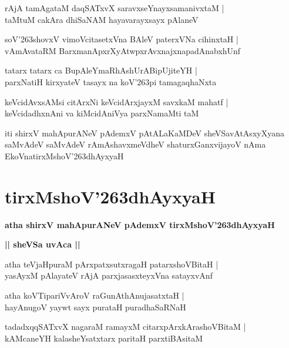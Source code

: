 \documentclass[twoside,12pt,openright]{book}
\def\S{\char'263}
\newcounter{shloka}[chapter]
\def\uvaca#1{\centerline{{\large\textbf{#1}}}}
\begin{document}
\begin{shloka}%
rAjA tamAgataM daqSATxvX saravxseYnayxsamanivxtaM |\\
taMtuM cakAra dhiSaNAM hayavarayxsayx pAlaneV 
\end{shloka}

\begin{shloka}%
soV\S shovxV vimoVcitasetxVna BAleV paterxVNa cihinxtaH |\\
vAmAvataRM BarxmanApxrXyAtwpxrAvxnajxnapadAnabxhUnf 
\end{shloka}

\begin{shloka}%
tatarx tatarx ca BupAleYmaRhAshUrABipUjiteYH |\\
parxNatiH kirxyateV tasayx na koV\S pi tamagaqhaNxta
\end{shloka}

\begin{shloka}%
keVcidAvxsAMsi citArxNi keVcidArxjayxM savxkaM mahatf |\\
keVcidadhxnAni va kiMcidAniVya parxNamaMti taM 
\end{shloka}

\begin{center}
iti shirxV mahApurANeV pAdemxV pAtALaKaMDeV sheVSavAtAsxyXyana saMvAdeV 
saMvAdeV rAmAshavxmeVdheV shaturxGanxvijayoV nAma EkoVnatirxMshoV\S dhAyxyaH
\end{center}

\chapter{tirxMshoV\S dhAyxyaH}

\begin{center}
{\LARGE\bfseries atha shirxV mahApurANeV pAdemxV tirxMshoV\S dhAyxyaH}
\end{center}

\uvaca{|| sheVSa uvAca ||}

\begin{shloka}%
atha teVjaHpuraM pArxpatxsutxragaH patarxshoVBitaH |\\
yasAyxM pAlayateV rAjA parxjasasxteyxVna satayxvAnf 
\end{shloka}

\begin{shloka}%
atha koVTipariVvAroV raGunAthAnujasatxtaH |\\
hayAnugoV yaywt sayx purataH puradhaSaRNaH
\end{shloka}

\begin{shloka}%
tadadxqqSATxvX nagaraM ramayxM citarxpArxkArashoVBitaM |\\
kAMcaneYH kalasheYsatxtarx paritaH parxtiBAsitaM
\end{shloka}
\end{document}
